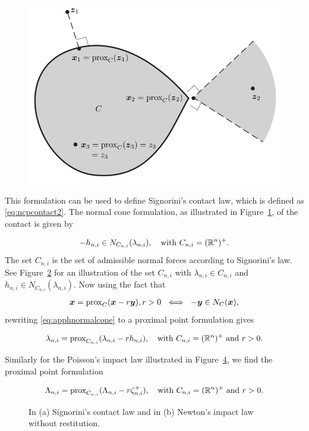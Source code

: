 \documentclass[../DC2017114Bouma.tex]{subfiles}
\begin{document}
\begin{figure}[bt!]
\centering
\includegraphics[width=.6\textwidth]{convex.PNG}\caption{}\label{fig:appconvex}
\end{figure}

This formulation can be used to define Signorini's contact law, which is defined as \eqref{eq:ncpcontact2}. The normal cone formulation, as illustrated in Figure~\ref{fig:appconvex}, of the contact is given by

\begin{align}
-h_{n,i} \in N_{C_{n,i}}(\lambda_{n,i}),\quad \text{with }C_{n,i} = (\mathbb{R}^n)^+.\label{eq:apphnormalcone}
\end{align}
The set $C_{n,i}$ is the set of admissible normal forces according to Signorini's law. See Figure~\ref{fig:appsignorinicontact} for an illustration of the set $C_{n,i}$ with $\lambda_{n,i}\in C_{n,i}$ and $h_{n,i} \in N_{C_{n,i}}(\lambda_{n,i})$. Now using the fact that
\begin{align}
{\boldsymbol{x}} = \operatorname{\text{prox}}_C({\boldsymbol{x}} -r{\boldsymbol{y}}), r > 0\ \iff\ -{\boldsymbol{y}}\in N_C({\boldsymbol{x}}),
\end{align}
rewriting \eqref{eq:apphnormalcone} to a proximal point formulation gives 

\begin{align}
\lambda_{n,i} = \operatorname{\text{prox}}_{C_{n,i}}(\lambda_{n,i} - rh_{n,i}),\quad \text{with }C_{n,i} = (\mathbb{R}^n)^+\text{ and } r>0.
\end{align}

Similarly for the Poisson's impact law illustrated in Figure~\ref{fig:appnewtonimpact}, we find the proximal point formulation

\begin{align}
\Lambda_{n,i} = \operatorname{\text{prox}}_{C_{n,i}}(\Lambda_{n,i} - r\zeta^+_{n,i}),\quad \text{with }C_{n,i} = (\mathbb{R}^n)^+\text{ and } r>0.
\end{align}

\begin{figure}[bt!]
\centering
\begin{subfigure}{0.3\textwidth}
\centering
\caption{}\label{fig:appsignorinicontact}
\end{subfigure}
\qquad
\begin{subfigure}{0.3\textwidth}
\centering
\caption{}\label{fig:appnewtonimpact}
\end{subfigure}
\caption{In \textnormal{(a)} Signorini's contact law and in \textnormal{(b)} Newton's impact law without restitution.}
\end{figure}
\end{document}
